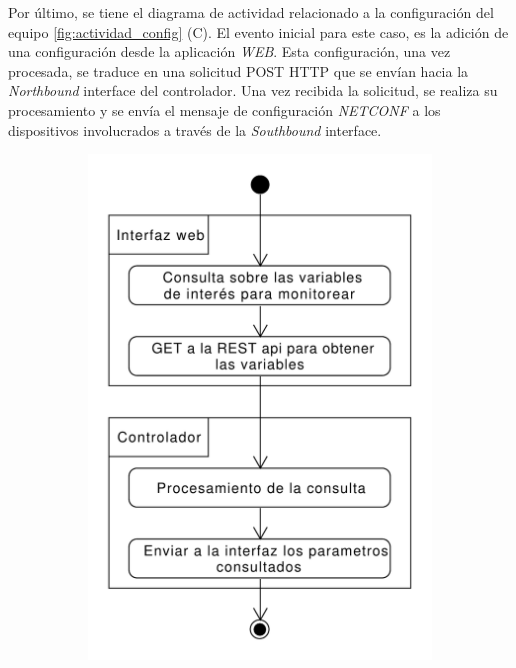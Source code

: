 Por último, se tiene el diagrama de actividad relacionado a la configuración del equipo \ref{fig:actividad_config} (C). El evento inicial para este caso, es la adición de una configuración desde la aplicación \textit{WEB}. Esta configuración, una vez procesada, se traduce en una solicitud POST HTTP que se envían hacia la \textit{Northbound} interface del controlador. Una vez recibida la solicitud, se realiza su procesamiento y se envía el mensaje de configuración \textit{NETCONF} a los dispositivos involucrados a través de la \textit{Southbound} interface.


  


  \begin{figure}[!h]
    \centering
    \begin{subfigure}[b]{0.43\textwidth}
        \centering
        \includegraphics[width=\textwidth]{Figures/actividad_monitoreo.pdf}

\end{subfigure}
\end{figure}
